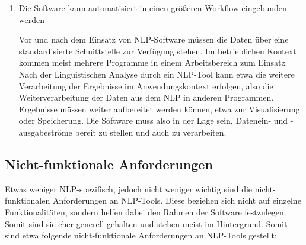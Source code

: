 \documentclass[12pt]{report}
\begin{document}
\begin{enumerate}
\item Die Software kann automatisiert in einen größeren Workflow eingebunden werden

Vor und nach dem Einsatz von NLP-Software müssen die Daten über eine standardisierte Schnittstelle zur Verfügung stehen. Im betrieblichen Kontext kommen meist mehrere Programme in einem Arbeitsbereich zum Einsatz. Nach der Linguistischen Analyse durch ein NLP-Tool kann etwa die weitere Verarbeitung der Ergebnisse im Anwendungskontext erfolgen, also die Weiterverarbeitung der Daten aus dem NLP in anderen Programmen. Ergebnisse müssen weiter aufbereitet werden können, etwa zur Visualisierung oder Speicherung. Die Software muss also in der Lage sein, Datenein- und -ausgabeströme bereit zu stellen und auch zu verarbeiten. 
\end{enumerate}

\subsection{Nicht-funktionale Anforderungen}
Etwas weniger NLP-spezifisch, jedoch nicht weniger wichtig sind die nicht-funktionalen Anforderungen an NLP-Tools. Diese beziehen sich nicht auf einzelne Funktionalitäten, sondern helfen dabei den Rahmen der Software festzulegen. Somit sind sie eher generell gehalten und stehen meist im Hintergrund. Somit sind etwa folgende nicht-funktionale Anforderungen an NLP-Tools gestellt:
\end{document}
